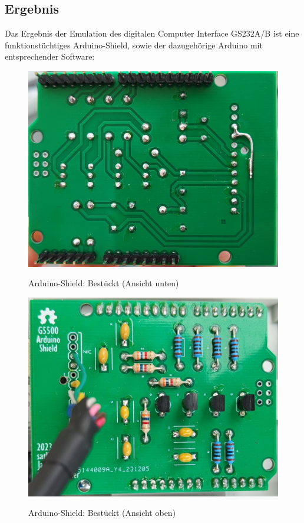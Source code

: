 \subsection{Ergebnis}
Das Ergebnis der Emulation des digitalen Computer Interface GS232A/B ist eine funktionstüchtiges Arduino-Shield, sowie der dazugehörige Arduino mit entsprechender Software:
\begin{figure}[H]
	\begin{minipage}[b]{.4\linewidth} %
		\includegraphics[width=\linewidth]{../ref/PCB_Unten_GS232.jpeg}
		\label{fig:PCB_Arduino-Shield_unten_Bestueckt}
		\caption{Arduino-Shield: Bestückt (Ansicht unten)}
	\end{minipage}
	\hspace{.1\linewidth}%
	\begin{minipage}[b]{.4\linewidth} %
		\includegraphics[width=\linewidth]{../ref/PCB_Oben_02_GS232.jpeg}
		\label{fig:PCB_Arduino-Shield_oben_Bestueckt}
		\caption{Arduino-Shield: Bestückt (Ansicht oben)}
	\end{minipage}
\end{figure}

